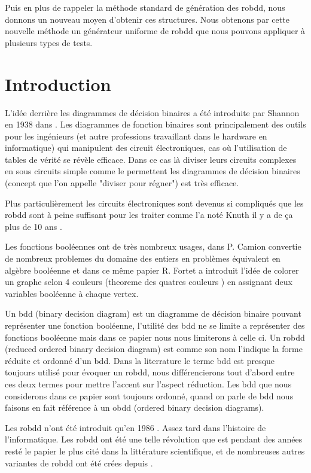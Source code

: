 \documentclass[french]{article}
\begin{document}
Puis en plus de rappeler la méthode standard de génération des robdd, nous donnons un nouveau moyen d'obtenir ces structures. Nous obtenons par cette nouvelle méthode un générateur uniforme de robdd que nous pouvons appliquer à plusieurs types de tests.

\newpage


\section{Introduction}
L'idée derrière les diagrammes de décision binaires a été introduite par Shannon en 1938 dans \cite{shannon}. Les diagrammes de fonction binaires sont principalement des outils pour les ingénieurs (et autre professions travaillant dans le hardware en informatique) qui manipulent des circuit électroniques, cas où l'utilisation de tables de vérité se révèle efficace. Dans ce cas là diviser leurs circuits complexes en sous circuits simple comme le permettent les diagrammes de décision binaires (concept que l'on appelle "diviser pour régner") est très efficace. 

Plus particulièrement les circuits électroniques sont devenus si compliqués que les robdd sont à peine suffisant pour les traiter comme l'a noté Knuth il y a de ça plus de 10 ans \cite{knuth}.

Les fonctions booléennes ont de très nombreux usages, dans \cite{cahier} P. Camion convertie de nombreux problemes du domaine des entiers en problèmes équivalent en algèbre booléenne et dans ce même papier R. Fortet a introduit l'idée de colorer un graphe selon 4 couleurs (theoreme des quatres couleurs \cite{dirac}) en assignant deux variables booléenne à chaque vertex.

Un bdd (binary decision diagram) est un diagramme de décision binaire pouvant représenter une fonction booléenne, l'utilité des bdd ne se limite a représenter des fonctions booléenne mais dans ce papier nous nous limiterons à celle ci. Un robdd (reduced ordered binary decision diagram) est comme son nom l'indique la forme réduite et ordonné d'un bdd. Dans la literrature le terme bdd est presque toujours utilisé pour évoquer un robdd, nous différencierons tout d'abord entre ces deux termes pour mettre l'accent sur l'aspect réduction. Les bdd que nous considerons dans ce papier sont toujours ordonné, quand on parle de bdd nous faisons en fait référence à un obdd  (ordered binary decision diagrams).

Les robdd n'ont été introduit qu'en 1986 \cite{bryant_graph}. Assez tard dans l'histoire de l'informatique. Les robdd ont été une telle révolution que \cite{bryant_graph} est pendant des années resté le papier le plus cité dans la littérature scientifique, et de nombreuses autres variantes de robdd ont été crées depuis \cite{wegner}.
\end{document}
